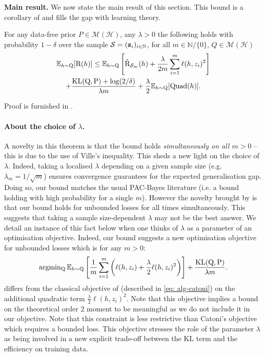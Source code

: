 \textbf{Main result.} We now state the main result of this section. This bound is a corollary of  and fills the gap with learning theory.
\begin{theorem}
\label{th: main_thm_iid}
For any data-free prior $P\in \mathcal{M}(\mathcal{H})$, any $\lambda>0$ the following holds with probability $1-\delta$ over the sample $\mathcal{S}=(\mathbf{z}_i)_{i\in\mathbb{N}}$, for all $m\in\mathbb{N}/\{0\}$, $Q\in\mathcal{M}(\mathcal{H})$
\begin{multline*}\mathbb{E}_{h\sim \mathrm{Q}} [\text{R}(h)] \leq   \mathbb{E}_{h\sim \mathrm{Q}} \left[\hat{\text{R}}_{\mathcal{S}_m}(h) + \frac{\lambda}{2m}\sum_{i=1}^m \ell(h,z_i)^2\right] \\
  + \frac{\operatorname{KL}(\mathrm{Q},\mathrm{P}) +\log(2/\delta)}{\lambda m} + \frac{\lambda}{2}\mathbb{E}_{h\sim \mathrm{Q}} [\mathrm{Quad}(h)]. 
\end{multline*}
\end{theorem}

Proof is furnished in .
\paragraph{About the choice of $\lambda$.} A novelty in this theorem is that the bound holds \emph{simultaneously on all $m>0$} -- this is due to the use of Ville's inequality.
This sheds a new light on the choice of $\lambda$. Indeed, taking a localised $ \lambda$ depending on a given sample size (e.g. $\lambda_m= 1/\sqrt{m}$) ensures convergence guarantees for the expected generalisation gap. Doing so, our bound matches the usual PAC-Bayes literature (i.e. a bound holding with high probability for a single $m$). However the novelty brought by  is that our bound holds for unbounded losses for all times simultaneously. This suggests that taking a sample size-dependent $\lambda$ may not be the best answer. We detail an instance of this fact below when one thinks of $\lambda$ as a parameter of an optimisation objective.
Indeed, our bound suggests a new optimisation objective for unbounded losses which is for any $m>0$:
\begin{equation}
  \label{eq: optim_obj}
  \operatorname{argmin_{Q}}  \mathbb{E}_{h\sim \mathrm{Q}} \left[\frac{1}{m}\sum_{i=1}^m\left(\ell(h,z_i) + \frac{\lambda}{2} \ell(h,z_i)^2\right)\right] + \frac{\operatorname{KL}(\mathrm{Q},\mathrm{P})}{\lambda m}.
\end{equation}
 differs from the classical objective of \citet[][Thm 1.2.6]{catoni2007pac} (described in \eqref{eq: alg-catoni}) on the additional quadratic term $\frac{\lambda}{2} \ell(h,z_i)^2$. Note that this objective implies a bound on the theoretical order 2 moment to be meaningful as we do not include it in our objective. Note that this constraint is less restrictive than Catoni's objective which requires a bounded loss.  This objective stresses the role of the parameter $\lambda$ as being involved in a new explicit trade-off between the KL term and the efficiency on training data.

